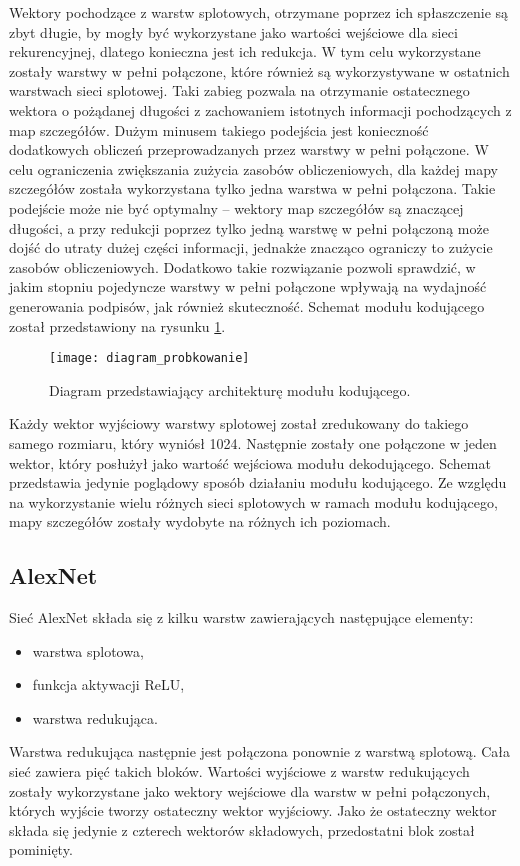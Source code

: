 Wektory pochodzące z warstw splotowych, otrzymane poprzez ich spłaszczenie są zbyt długie, by mogły być wykorzystane jako wartości wejściowe dla sieci rekurencyjnej, dlatego konieczna jest ich redukcja. W tym celu wykorzystane zostały warstwy w pełni połączone, które również są wykorzystywane w ostatnich warstwach sieci splotowej. Taki zabieg pozwala na otrzymanie ostatecznego wektora o pożądanej długości z zachowaniem istotnych informacji pochodzących z map szczegółów. Dużym minusem takiego podejścia jest konieczność dodatkowych obliczeń przeprowadzanych przez warstwy w pełni połączone. W celu ograniczenia zwiększania zużycia zasobów obliczeniowych, dla każdej mapy szczegółów została wykorzystana tylko jedna warstwa w pełni połączona. Takie podejście może nie być optymalny -- wektory map szczegółów są znaczącej długości, a przy redukcji poprzez tylko jedną warstwę w pełni połączoną może dojść do utraty dużej części informacji, jednakże znacząco ograniczy to zużycie zasobów obliczeniowych. Dodatkowo takie rozwiązanie pozwoli sprawdzić, w jakim stopniu pojedyncze warstwy w pełni połączone wpływają na wydajność generowania podpisów, jak również skuteczność. Schemat modułu kodującego został przedstawiony na rysunku \ref{fig:schemat-probkowanie}.
\begin{figure}[H]
    \centering
    \texttt{[image: diagram\_probkowanie]}
    \caption{Diagram przedstawiający architekturę modułu kodującego.}
    \label{fig:schemat-probkowanie}
\end{figure}
\noindent Każdy wektor wyjściowy warstwy splotowej został zredukowany do takiego samego rozmiaru, który wyniósł 1024. Następnie zostały one połączone w jeden wektor, który posłużył jako wartość wejściowa modułu dekodującego. Schemat przedstawia jedynie poglądowy sposób działaniu modułu kodującego. Ze względu na wykorzystanie wielu różnych sieci splotowych w ramach modułu kodującego, mapy szczegółów zostały wydobyte na różnych ich poziomach.
\subsection{AlexNet}
Sieć AlexNet \cite{alexnet} składa się z kilku warstw zawierających następujące elementy:
\begin{itemize}
    \item warstwa splotowa,
    \item funkcja aktywacji ReLU,
    \item warstwa redukująca.
\end{itemize}
Warstwa redukująca następnie jest połączona ponownie z warstwą splotową. Cała sieć zawiera pięć takich bloków. Wartości wyjściowe z warstw redukujących zostały wykorzystane jako wektory wejściowe dla warstw w pełni połączonych, których wyjście tworzy ostateczny wektor wyjściowy. Jako że ostateczny wektor składa się jedynie z czterech wektorów składowych, przedostatni blok został pominięty.
